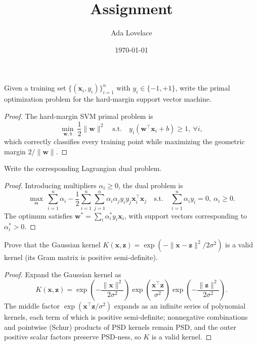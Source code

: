 \documentclass[oneside,solution]{seu-ml-assign}
\title{Assignment}
\author{Ada Lovelace}
\date{\today}
\begin{document}
\maketitle

\subproblem{}
Given a training set $\{(\mathbf{x}_i, y_i)\}_{i=1}^n$ with
$y_i \in \{-1,+1\}$, write the primal optimization problem for the
hard-margin support vector machine.

\begin{proof}
The hard-margin SVM primal problem is
\begin{equation}
    \min_{\mathbf{w},b} \ \frac{1}{2}\|\mathbf{w}\|^2
    \quad \text{s.t.} \quad y_i(\mathbf{w}^\top\mathbf{x}_i + b) \ge 1,\ \forall i,
\end{equation}
which correctly classifies every training point while maximizing the
geometric margin $2/\|\mathbf{w}\|$.
\end{proof}

\subproblem{}
Write the corresponding Lagrangian dual problem.

\begin{proof}
Introducing multipliers $\alpha_i \ge 0$, the dual problem is
\begin{equation}
    \max_{\bm{\alpha}} \ \sum_{i=1}^n \alpha_i
    - \frac{1}{2}\sum_{i=1}^n\sum_{j=1}^n \alpha_i\alpha_j y_i y_j \mathbf{x}_i^\top\mathbf{x}_j
    \quad \text{s.t.} \quad \sum_{i=1}^n \alpha_i y_i = 0,\ \alpha_i \ge 0.
\end{equation}
The optimum satisfies $\mathbf{w}^* = \sum_i \alpha_i^* y_i \mathbf{x}_i$,
with support vectors corresponding to $\alpha_i^* > 0$.
\end{proof}

\subproblem{}
Prove that the Gaussian kernel
$K(\mathbf{x},\mathbf{z}) = \exp(-\|\mathbf{x}-\mathbf{z}\|^2/2\sigma^2)$
is a valid kernel (its Gram matrix is positive semi-definite).

\begin{proof}
Expand the Gaussian kernel as
\begin{equation}
    K(\mathbf{x},\mathbf{z}) = \exp\left(-\frac{\|\mathbf{x}\|^2}{2\sigma^2}\right)
    \exp\left(\frac{\mathbf{x}^\top\mathbf{z}}{\sigma^2}\right)
    \exp\left(-\frac{\|\mathbf{z}\|^2}{2\sigma^2}\right).
\end{equation}
The middle factor $\exp(\mathbf{x}^\top\mathbf{z}/\sigma^2)$ expands as
an infinite series of polynomial kernels, each term of which is
positive semi-definite; nonnegative combinations and pointwise
(Schur) products of PSD kernels remain PSD, and the outer positive
scalar factors preserve PSD-ness, so $K$ is a valid kernel.
\end{proof}
\end{document}
